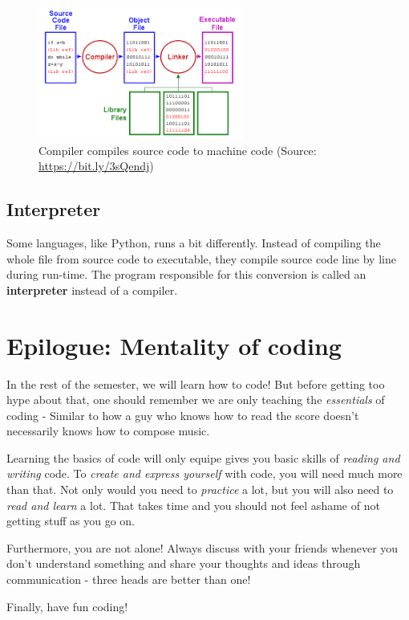 \documentclass[a4paper,12pt]{article}
\begin{document}
\begin{figure}[h]
    \centering
    \includegraphics[width=0.6\textwidth]{img/compiling.png}
    \caption{Compiler compiles source code to machine code (Source: \href{https://bit.ly/3sQendj}{https://bit.ly/3sQendj})}
    \label{fig:compiler}
\end{figure}

\subsection{Interpreter}
Some languages, like Python, runs a bit differently. Instead of compiling the whole file from source code to executable, they compile source code line by line during run-time. The program responsible for this conversion is called an \textbf{interpreter} instead of a compiler.

\section{Epilogue: Mentality of coding}
In the rest of the semester, we will learn how to code! But before getting too hype about that, one should remember we are only teaching the \textit{essentials} of coding - Similar to how a guy who knows how to read the score doesn't necessarily knows how to compose music. 

Learning the basics of code will only equipe gives you basic skills of \textit{reading and writing} code. To \textit{create and express yourself}  with code, you will need much more than that. Not only would you need to \textit{practice} a lot, but you will also need to \textit{read and learn} a lot. That takes time and you should not feel ashame of not getting stuff as you go on. 

Furthermore, you are not alone! Always discuss with your friends whenever you don't understand something and share your thoughts and ideas through communication - three heads are better than one!

Finally, have fun coding!
\printbibliography
\end{document}

